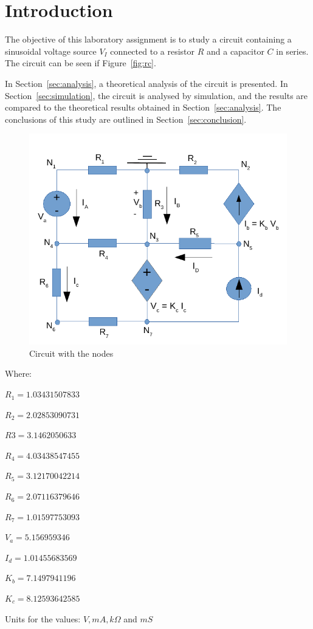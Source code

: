 \section{Introduction}
\label{sec:introduction}

The objective of this laboratory assignment is to study a circuit containing a
sinusoidal voltage source $V_I$ connected to a resistor $R$ and a capacitor $C$
in series. The circuit can be seen if Figure~\ref{fig:rc}.

In Section~\ref{sec:analysis}, a theoretical analysis of the circuit is
presented. In Section~\ref{sec:simulation}, the circuit is analysed by
simulation, and the results are compared to the theoretical results obtained in
Section~\ref{sec:analysis}. The conclusions of this study are outlined in
Section~\ref{sec:conclusion}.

\begin{figure}[h] \centering
\includegraphics[width=0.7\linewidth]{circuito.pdf}
\caption{Circuit with the nodes} %
\label{fig:circuito}
\end{figure}


\begin{center}


Where:

$R_1 = 1.03431507833 $

$R_2 = 2.02853090731$
 
$R3 = 3.1462050633 $

$R_4 = 4.03438547455$ 

$R_5 = 3.12170042214 $

$R_6 = 2.07116379646 $

$R_7 = 1.01597753093 $

$V_a = 5.156959346 $

$I_d = 1.01455683569 $

$K_b = 7.1497941196 $

$K_c = 8.12593642585 $
\end{center}

Units for the values: $V, mA, k\Omega$ and $mS$




